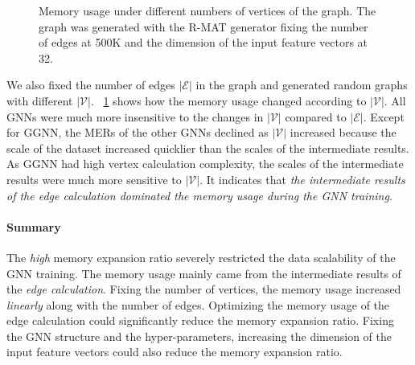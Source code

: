 \begin{figure}
    \centering
    \caption{Memory usage under different numbers of vertices of the graph. The graph was generated with the R-MAT generator fixing the number of edges at 500K and the dimension of the input feature vectors at 32.}
    \label{fig:exp_memory_expansion_ratio_input_graph_number_of_vertices_fixed_edge}
\end{figure}

We also fixed the number of edges $|\mathcal{E}|$ in the graph and generated random graphs with different $|\mathcal{V}|$.
\figurename~\ref{fig:exp_memory_expansion_ratio_input_graph_number_of_vertices_fixed_edge} shows how the memory usage changed according to $|\mathcal{V}|$.
All GNNs were much more insensitive to the changes in $|\mathcal{V}|$ compared to $|\mathcal{E}|$.
Except for GGNN, the MERs of the other GNNs declined as $|\mathcal{V}|$ increased because the scale of the dataset increased quicklier than the scales of the intermediate results.
As GGNN had high vertex calculation complexity, the scales of the intermediate results were much more sensitive to $|\mathcal{V}|$.
It indicates that \emph{the intermediate results of the edge calculation dominated the memory usage during the GNN training}.

\paragraph{Summary}
The \emph{high} memory expansion ratio severely restricted the data scalability of the GNN training.
The memory usage mainly came from the intermediate results of the \emph{edge calculation}.
Fixing the number of vertices, the memory usage increased \emph{linearly} along with the number of edges.
Optimizing the memory usage of the edge calculation could significantly reduce the memory expansion ratio.
Fixing the GNN structure and the hyper-parameters, increasing the dimension of the input feature vectors could also reduce the memory expansion ratio.

